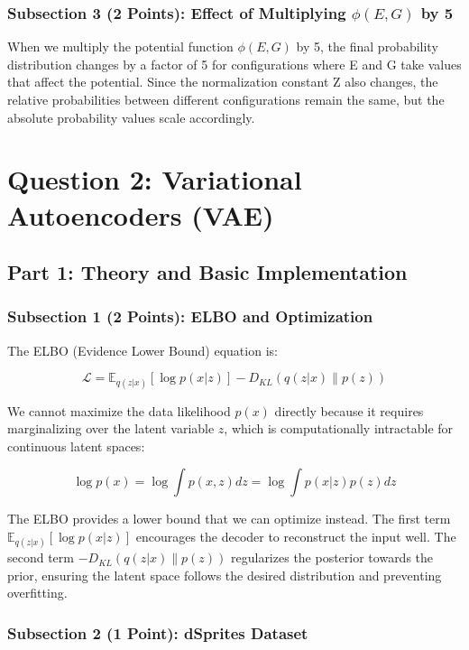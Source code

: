 \documentclass[conference]{IEEEtran}
\begin{document}
\subsubsection{Subsection 3 (2 Points): Effect of Multiplying $\phi(E,G)$ by 5}

When we multiply the potential function $\phi(E,G)$ by 5, the final probability distribution changes by a factor of 5 for configurations where E and G take values that affect the potential. Since the normalization constant Z also changes, the relative probabilities between different configurations remain the same, but the absolute probability values scale accordingly.

\section{Question 2: Variational Autoencoders (VAE)}

\subsection{Part 1: Theory and Basic Implementation}

\subsubsection{Subsection 1 (2 Points): ELBO and Optimization}

The ELBO (Evidence Lower Bound) equation is:

\[\mathcal{L} = \mathbb{E}_{q(z|x)}[\log p(x|z)] - D_{KL}(q(z|x) \| p(z))\]

We cannot maximize the data likelihood $p(x)$ directly because it requires marginalizing over the latent variable $z$, which is computationally intractable for continuous latent spaces:

\[\log p(x) = \log \int p(x,z) dz = \log \int p(x|z)p(z) dz\]

The ELBO provides a lower bound that we can optimize instead. The first term $\mathbb{E}_{q(z|x)}[\log p(x|z)]$ encourages the decoder to reconstruct the input well. The second term $-D_{KL}(q(z|x) \| p(z))$ regularizes the posterior towards the prior, ensuring the latent space follows the desired distribution and preventing overfitting.

\subsubsection{Subsection 2 (1 Point): dSprites Dataset}
\end{document}
